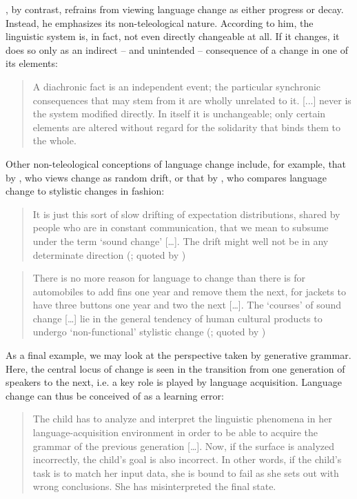 \documentclass[output=paper,hidelinks]{langscibook}
\begin{document}
, by contrast, refrains from viewing language change as either progress or decay. Instead, he emphasizes its non-teleological nature. According to him, the linguistic system is, in fact, not even directly changeable at all. If it changes, it does so only as an indirect -- and unintended -- consequence of a change in one of its elements:

\begin{quote}
A diachronic fact is an independent event; the particular synchronic consequences that may stem from it are wholly unrelated to it. [...] never is the system modified directly. In itself it is unchangeable; only certain elements are altered without regard for the solidarity that binds them to the whole. \citep[84]{Saussure2011}
\end{quote}

Other non-teleological conceptions of language change include, for example, that by \citet{Hockett_1958}, who views change as random drift, or that by \citet{Postal_1968}, who compares language change to stylistic changes in fashion:

\begin{quote}
It is just this sort of slow drifting of expectation distributions, shared by people who are in constant communication, that we mean to subsume under the term ‘sound change’ […]. The drift might well not be in any determinate direction (\citealt[443--445]{Hockett_1958}; quoted by \citealt[135--136]{Aitchison_2001})
\end{quote}

\begin{quote}
There is no more reason for language to change than there is for automobiles to add fins one year and remove them the next, for jackets to have three buttons one year and two the next […]. The ‘courses’ of sound change […] lie in the general tendency of human cultural products to undergo ‘non-functional’ stylistic change (\citealt[283]{Postal_1968}; quoted by \citealt[135]{Aitchison_2001})
\end{quote}

As a final example, we may look at the perspective taken by generative grammar. Here, the central locus of change is seen in the transition from one generation of speakers to the next, i.e. a key role is played by language acquisition. Language change can thus be conceived of as a learning error:

\begin{quote}
The child has to analyze and interpret the linguistic phenomena in her language-acquisition environment in order to be able to acquire the grammar of the previous generation […]. Now, if the surface is analyzed incorrectly, the child's goal is also incorrect. In other words, if the child's task is to match her input data, she is bound to fail as she sets out with wrong conclusions. She has misinterpreted the final state. \citep[119]{Hróarsdóttir_2009}
\end{quote}
\end{document}
